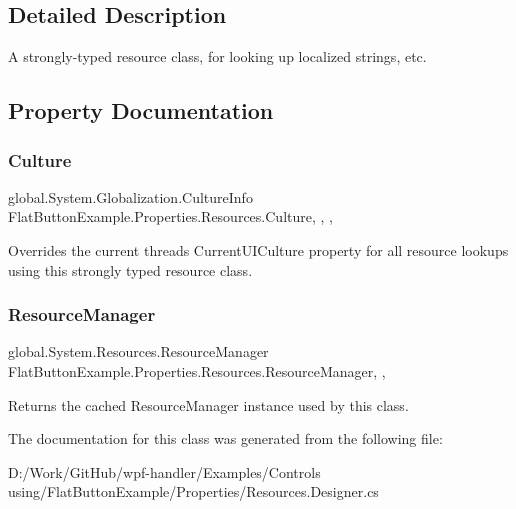 \subsection{Detailed Description}
A strongly-\/typed resource class, for looking up localized strings, etc. 



\subsection{Property Documentation}
\mbox{\label{class_flat_button_example_1_1_properties_1_1_resources_a32beafa8d558f7938ce6714586e65a58}} 
\subsubsection{\texorpdfstring{Culture}{Culture}}
{\footnotesize\ttfamily global.\+System.\+Globalization.\+Culture\+Info Flat\+Button\+Example.\+Properties.\+Resources.\+Culture\hspace{0.3cm}{\ttfamily [static]}, {\ttfamily [get]}, {\ttfamily [set]}, {\ttfamily [package]}}



Overrides the current thread\textquotesingle{}s Current\+U\+I\+Culture property for all resource lookups using this strongly typed resource class. 

\mbox{\label{class_flat_button_example_1_1_properties_1_1_resources_a45fd91f5175b258569cf29b2587e0663}} 
\subsubsection{\texorpdfstring{Resource\+Manager}{ResourceManager}}
{\footnotesize\ttfamily global.\+System.\+Resources.\+Resource\+Manager Flat\+Button\+Example.\+Properties.\+Resources.\+Resource\+Manager\hspace{0.3cm}{\ttfamily [static]}, {\ttfamily [get]}, {\ttfamily [package]}}



Returns the cached Resource\+Manager instance used by this class. 



The documentation for this class was generated from the following file\+:\begin{DoxyCompactItemize}
\item 
D\+:/\+Work/\+Git\+Hub/wpf-\/handler/\+Examples/\+Controls using/\+Flat\+Button\+Example/\+Properties/Resources.\+Designer.\+cs\end{DoxyCompactItemize}
